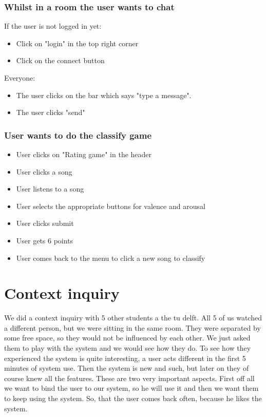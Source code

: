\subsubsection{Whilst in a room the user wants to chat}
If the user is not logged in yet:
\begin{itemize}
\item Click on "login" in the top right corner
\item Click on the connect button
\end{itemize}
Everyone:
\begin{itemize}
\item The user clicks on the bar which says "type a message".
\item The user clicks "send"
\end{itemize}

\subsubsection{User wants to do the classify game}
\begin{itemize}
\item User clicks on "Rating game" in the header
\item User clicks a song
\item User listens to a song
\item User selects the appropriate buttons for valence and arousal
\item User clicks submit
\item User gets 6 points
\item User comes back to the menu to click a new song to classify
\end{itemize}


\section{Context inquiry}
We did a context inquiry with 5 other students a the tu delft.
All 5 of us watched a different person, but we were sitting in the same room.
They were separated by some free space, so they would not be influenced by each other.
We just asked them to play with the system and we would see how they do.
To see how they experienced the system is quite interesting, a user acts different in the first 5 minutes of system use.
Then the system is new and such, but later on they of course knew all the features.
These are two very important aspects.
First off all we want to bind the user to our system, so he will use it and then we want them to keep using the system.
So, that the user comes back often, because he likes the system.\\

